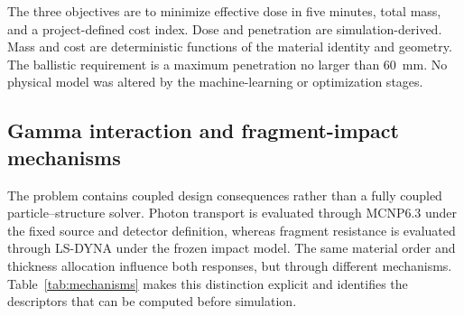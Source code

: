\documentclass[12pt]{elsarticle}
\newcommand{\SI}[2]{#1~#2}
\begin{document}
	The three objectives are to minimize effective dose in five minutes, total mass, and a project-defined cost index. Dose and penetration are simulation-derived. Mass and cost are deterministic functions of the material identity and geometry. The ballistic requirement is a maximum penetration no larger than \SI{60}{mm}. No physical model was altered by the machine-learning or optimization stages.

	\subsection{Gamma interaction and fragment-impact mechanisms}

	The problem contains coupled design consequences rather than a fully coupled particle--structure solver. Photon transport is evaluated through MCNP6.3 under the fixed source and detector definition, whereas fragment resistance is evaluated through LS-DYNA under the frozen impact model. The same material order and thickness allocation influence both responses, but through different mechanisms. Table~\ref{tab:mechanisms} makes this distinction explicit and identifies the descriptors that can be computed before simulation.
\end{document}
